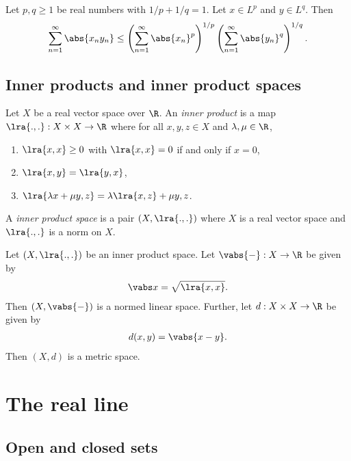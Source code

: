 \documentclass{article}
\begin{document}
\begin{lemma}
    Let $p,q\geq 1$ be real numbers with $1/p+1/q=1$. Let $x\in L^p$ and $y\in L^q$. Then
    \begin{align*}
        \sum_{n=1}^\infty \abs{x_ny_n}\leq
        \left(\sum_{n=1}^\infty\abs{x_n}^p\right)^{1/p}
        \left(\sum_{n=1}^\infty\abs{y_n}^q\right)^{1/q}.
    \end{align*}
\end{lemma}

\subsection{Inner products and inner product spaces}

\begin{definition}
    Let $X$ be a real vector space over $\R$. An \emph{inner product}
    is a map $\lra{.,.}:X\times X\to\R$ where for all $x,y,z\in X$ and
    $\lambda,\mu\in\R$,
    \begin{enumerate}
        \item $\lra{x,x}\geq 0$ with $\lra{x,x}=0$ if and only if $x=0$,
        \item $\lra{x,y}=\lra{y,x}$,
        \item $\lra{\lambda x+\mu y,z}=\lambda\lra{x,z}+\mu{y,z}$.
    \end{enumerate}
    A \emph{inner product space} is a pair $(X, \lra{.,.})$ where $X$ is a real
    vector space and $\lra{.,.}$ is a norm on $X$.
\end{definition}

\begin{lemma}
    Let $(X,\lra{.,.})$ be an inner product space. Let $\vabs{-}:X\to\R$ be given
    by
    \begin{align*}
        \vabs x = \sqrt{\lra{x,x}}.
    \end{align*}
    Then $(X,\vabs{-})$ is a normed linear space. Further, let $d:X\times X\to\R$
    be given by
    \begin{align*}
        d(x,y)=\vabs{x-y}.
    \end{align*}
    Then $(X,d)$ is a metric space.
\end{lemma}

\section{The real line}

\subsection{Open and closed sets}
\end{document}
